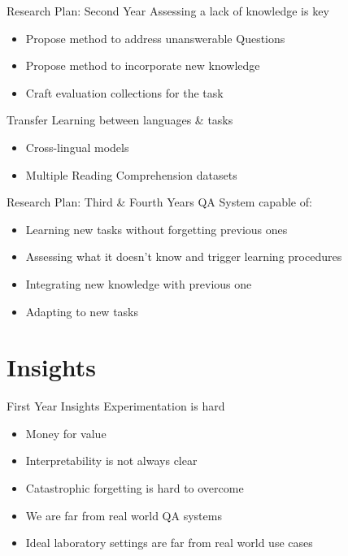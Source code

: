 \documentclass{beamer}
\begin{document}
\begin{frame}{Research Plan: Second Year}
  \alert{\Large Assessing a lack of knowledge is key}
  \begin{itemize}
    \item Propose method to address unanswerable Questions
    \item Propose method to incorporate new knowledge
    \item Craft evaluation collections for the task
  \end{itemize}
  \alert{\Large Transfer Learning between languages \& tasks}
  \begin{itemize}
    \item Cross-lingual models
    \item Multiple Reading Comprehension datasets
  \end{itemize}
\end{frame}


\begin{frame}{Research Plan: Third \& Fourth Years}
  \alert{\Large QA System capable of:}
  \begin{itemize}
    \item Learning new tasks without forgetting previous ones
    \item Assessing what it doesn't know and trigger learning procedures
    \item Integrating new knowledge with previous one
    \item Adapting to new tasks
  \end{itemize}
\end{frame}

\section{Insights}
\begin{frame}{First Year Insights}
  \alert{\Large Experimentation is hard}
  \begin{itemize}
    \item Money for value
    \item Interpretability is not always clear
    \item Catastrophic forgetting is hard to overcome
    \item We are far from real world QA systems
    \item Ideal laboratory settings are far from real world use cases
  \end{itemize}
\end{frame}
\end{document}
